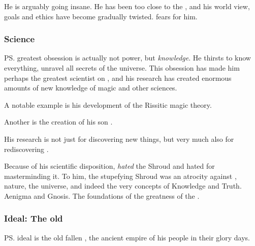 He is arguably going insane. 
He has been too close to the \xss, and his world view, goals and ethics have become gradually twisted. 
\Nzessuacrith{} fears for him. 





\subsubsection{Science}
\ps{\Secherdamon} greatest obsession is actually not power, but \emph{knowledge}. He thirsts to know everything, unravel all secrets of the universe. This obsession has made him perhaps the greatest scientist on \Miith{}, and his research has created enormous amounts of new knowledge of magic and other sciences. 

A notable example is his development of the Rissitic magic theory. 

Another is the creation of his son .

His research is not just for discovering new things, but very much also for rediscovering . 

Because of his scientific disposition, \Secherdamon{} \emph{hated} the Shroud and hated \Ishnaruchaefir{} for masterminding it. 
To him, the stupefying Shroud was an atrocity against \Miith, nature, the universe, and indeed the very concepts of Knowledge and Truth. 
Aenigma and Gnosis. 
The foundations of the greatness of the \dzraicchenosses. 





\subsubsection{Ideal: The old \dragonland}
\ps{\Secherdamon} ideal is the old fallen \dragonland, the ancient empire of his people in their glory days. 

